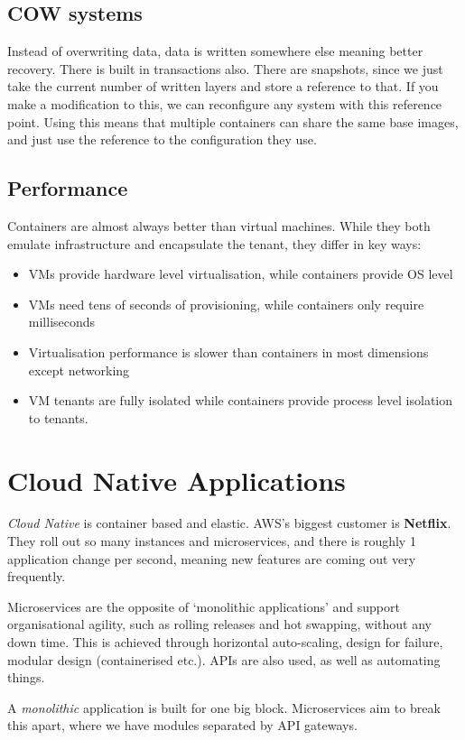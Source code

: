 \documentclass[11pt,a4paper,titlepage,dvipsnames,cmyk]{scrartcl}
\begin{document}
\subsection{COW systems}
Instead of overwriting data, data is written somewhere else meaning better recovery. There is built in transactions also. There are snapshots, since we just take the current number of written layers and store a reference to that. If you make a modification to this, we can reconfigure any system with this reference point. Using this means that multiple containers can share the same base images, and just use the reference to the configuration they use.

\subsection{Performance}
Containers are almost always better than virtual machines. While they both emulate infrastructure and encapsulate the tenant, they differ in key ways:
\begin{itemize}
    \item VMs provide hardware level virtualisation, while containers provide OS level
    \item VMs need tens of seconds of provisioning, while containers only require milliseconds
    \item Virtualisation performance is slower than containers in most dimensions except networking
    \item VM tenants are fully isolated while containers provide process level isolation to tenants.
\end{itemize}

\section{Cloud Native Applications}
\textit{Cloud Native} is container based and elastic. AWS's biggest customer is \textbf{Netflix}. They roll out so many instances and microservices, and there is roughly 1 application change per second, meaning new features are coming out very frequently.

Microservices are the opposite of `monolithic applications' and support organisational agility, such as rolling releases and hot swapping, without any down time. This is achieved through horizontal auto-scaling, design for failure, modular design (containerised etc.). APIs are also used, as well as automating things.

A \textit{monolithic} application is built for one big block. Microservices aim to break this apart, where we have modules separated by API gateways.
\end{document}
